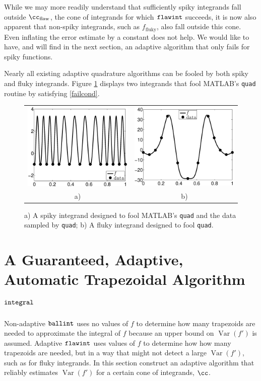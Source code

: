 \documentclass[]{article}
\DeclareMathOperator{\integ}{\texttt{\textup{integral}}}
\DeclareMathOperator{\flawinteg}{\texttt{\textup{flawint}}}
\DeclareMathOperator{\ballinteg}{\texttt{\textup{ballint}}}
\DeclareMathOperator{\Var}{Var}
\theoremstyle{definition}
\theoremstyle{remark}
\begin{document}
While we may more readily understand that sufficiently spiky integrands fall outside $\cc_{\text{flaw}}$, the cone of integrands for which $\flawinteg$ succeeds, it is now also apparent that non-spiky integrands, such as $f_{\text{fluky}}$, also fall outside this cone. Even inflating the error estimate by a constant does not help. We would like to have, and will find in the next section, an adaptive algorithm that only fails for spiky functions. 

Nearly all existing adaptive quadrature algorithms can be fooled by both spiky and fluky integrands.  Figure \ref{fig:foolquad} displays two integrands that fool MATLAB's {\tt quad} routine by satisfying \eqref{failcond}.

\begin{figure}
\centering 
\begin{tabular}{cc}
\includegraphics[width=5.5cm]{ExpositoryPaperSpikyquad.eps}
&
\includegraphics[width=5.5cm]{ExpositoryPaperFlukyquad.eps} \\
a) & b)
\end{tabular}
\caption{a) A spiky integrand designed to fool MATLAB's {\tt quad} and the data sampled by {\tt quad}; b) A fluky integrand designed to fool {\tt quad}. \label{fig:foolquad}}
\end{figure}

\section{A Guaranteed, Adaptive, Automatic Trapezoidal Algorithm $\integ$} \label{newalgosec}

Non-adaptive $\ballinteg$ uses no values of $f$ to determine how many trapezoids are needed to approximate the integral of $f$ because an upper bound on $\Var(f')$ is assumed.  Adaptive $\flawinteg$ uses values of $f$ to determine how how many trapezoids are needed, but in a way that might not detect a large $\Var(f')$, such as for fluky integrands.  In this section construct an adaptive algorithm that reliably estimates $\Var(f')$ for a certain cone of integrands, $\cc$.
\end{document}
